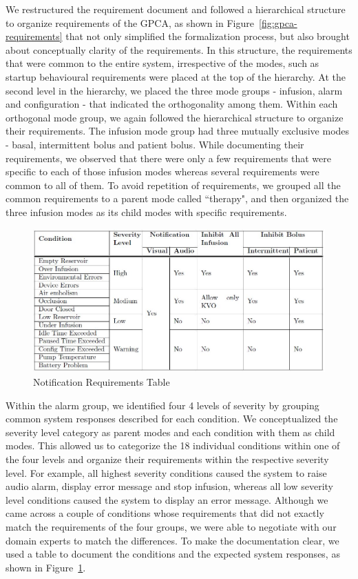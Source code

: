 We restructured the requirement document and followed a hierarchical structure to organize requirements of the GPCA, as shown in Figure~\ref{fig:gpca-requirements} that not only simplified the formalization process, but also brought about conceptually clarity of the requirements. In this structure, the requirements that were common to the entire system, irrespective of the modes, such as startup behavioural requirements were placed at the top of the hierarchy. At the second level in the hierarchy, we placed the three mode groups - infusion, alarm and configuration - that indicated the orthogonality among them. Within each orthogonal mode group, we again followed the hierarchical structure to organize their requirements. The infusion mode group had three mutually exclusive modes - basal, intermittent bolus and patient bolus. While documenting their requirements, we observed that there were only a few requirements that were specific to each of those infusion modes whereas several requirements were common to all of them. To avoid repetition of requirements, we grouped all the common requirements to a parent mode called ``therapy", and then organized the three infusion modes as its child modes with specific requirements.

 \begin{figure}[h!]
    \centering
    \includegraphics[width=\columnwidth]{images/alarm.jpg}
    \caption{Notification Requirements Table}
    \label{fig:gpca-alarm}
 \end{figure}

Within the alarm group, we identified four 4 levels of severity by grouping common system responses described for each condition. We conceptualized the severity level category as parent modes and each condition with them as child modes. This allowed us to categorize the 18 individual conditions within one of the four levels and organize their requirements within the respective severity level. For example, all highest severity conditions caused the system to raise audio alarm, display error message and stop infusion, whereas all low severity level conditions caused the system to display an error message. Although we came across a couple of conditions whose requirements that did not exactly match the requirements of the four groups, we were able to negotiate with our domain experts to match the differences. To make the documentation clear, we used a table to document the conditions and the expected system responses, as shown in Figure~\ref{fig:gpca-alarm}.

